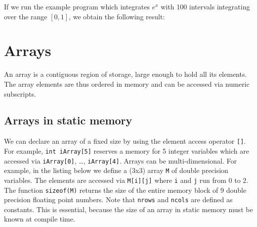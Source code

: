 \noindent{\small}

If we run the example program which integrates $e^x$ with 100 intervals integrating
over the range $[0,1]$, we obtain the following result:



\section{Arrays}
An array  is a contiguous region of storage, large enough to hold all
its elements. The array elements are thus ordered in memory and can be accessed via
numeric subscripts.

\subsection{Arrays in static memory}

We can declare an array of a fixed size by using the element access operator \verb+[]+.
For example,  \verb+int iArray[5]+ reserves a memory for 5 integer variables which are
accessed via \verb+iArray[0]+, \dots, \verb+iArray[4]+. Arrays can be multi-dimensional.
For example, in the listing below we define a (3x3) array \verb+M+ of double precision
variables.
 The elements are accessed via
\verb+M[i][j]+ where \verb+i+ and \verb+j+ run from 0 to 2. The function
\verb+sizeof(M)+  returns the size of the entire memory
block of 9 double precision
floating point numbers. Note that \verb+nrows+ and \verb+ncols+ are defined as
constants. This is essential, because the size of an array in static memory must
be known at compile time.

\noindent {\small }

